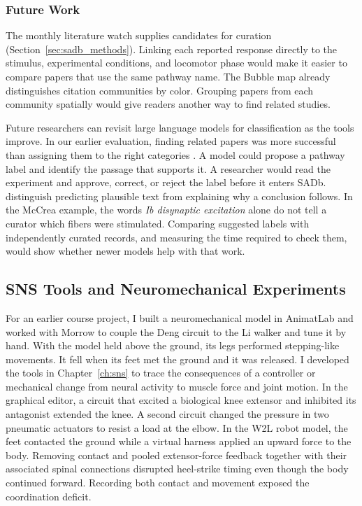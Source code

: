 \subsubsection{Future Work}\label{sec:fw_database}

The monthly literature watch supplies candidates for curation (Section~\ref{sec:sadb_methods}). Linking each reported response directly to the stimulus, experimental conditions, and locomotor phase would make it easier to compare papers that use the same pathway name. The Bubble map already distinguishes citation communities by color. Grouping papers from each community spatially would give readers another way to find related studies.

Future researchers can revisit large language models for classification as the tools improve. In our earlier evaluation, finding related papers was more successful than assigning them to the right categories \citep{bolen_using_2024}. A model could propose a pathway label and identify the passage that supports it. A researcher would read the experiment and approve, correct, or reject the label before it enters SADb. \citet{chomsky_false_promise_2023} distinguish predicting plausible text from explaining why a conclusion follows. In the McCrea example, the words \emph{Ib disynaptic excitation} alone do not tell a curator which fibers were stimulated. Comparing suggested labels with independently curated records, and measuring the time required to check them, would show whether newer models help with that work.

\subsection{SNS Tools and Neuromechanical Experiments}

For an earlier course project, I built a neuromechanical model in AnimatLab and worked with Morrow to couple the Deng circuit to the Li walker and tune it by hand. With the model held above the ground, its legs performed stepping-like movements. It fell when its feet met the ground and it was released. I developed the tools in Chapter~\ref{ch:sns} to trace the consequences of a controller or mechanical change from neural activity to muscle force and joint motion. In the graphical editor, a circuit that excited a biological knee extensor and inhibited its antagonist extended the knee. A second circuit changed the pressure in two pneumatic actuators to resist a load at the elbow. In the W2L robot model, the feet contacted the ground while a virtual harness applied an upward force to the body. Removing contact and pooled extensor-force feedback together with their associated spinal connections disrupted heel-strike timing even though the body continued forward. Recording both contact and movement exposed the coordination deficit.

